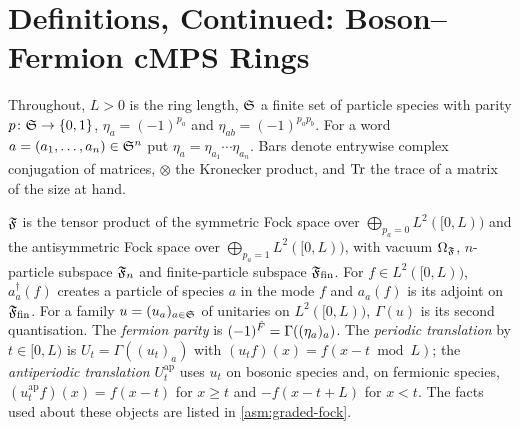 
\section{Definitions, Continued: Boson--Fermion cMPS Rings}
\label{sec:definitions-graded-cmps}

Throughout, $L>0$ is the ring length, $\mathfrak S$ a finite set of particle species with parity
$p\colon\mathfrak S\to\{0,1\}$, $\eta_a=(-1)^{p_a}$ and $\eta_{ab}=(-1)^{p_ap_b}$. For a word
$a=(a_1,\dots,a_n)\in\mathfrak S^n$ put $\eta_a=\eta_{a_1}\cdots\eta_{a_n}$. Bars denote entrywise
complex conjugation of matrices, $\otimes$ the Kronecker product, and $\operatorname{Tr}$ the trace of a
matrix of the size at hand.

\begin{definition}
\label{def:graded-fock}
$\mathfrak F$ is the tensor product of the symmetric Fock space over
$\bigoplus_{p_a=0}L^2([0,L))$ and the antisymmetric Fock space over
$\bigoplus_{p_a=1}L^2([0,L))$, with vacuum $\Omega_{\mathfrak F}$, $n$-particle subspace $\mathfrak F_n$ and
finite-particle subspace $\mathfrak F_{\mathrm{fin}}$. For $f\in L^2([0,L))$, $a^\dagger_a(f)$
creates a particle of species $a$ in the mode $f$ and $a_a(f)$ is its adjoint on
$\mathfrak F_{\mathrm{fin}}$. For a family $u=(u_a)_{a\in\mathfrak S}$ of unitaries on $L^2([0,L))$,
$\Gamma(u)$ is its second quantisation. The \emph{fermion parity} is
$(-1)^{\hat F}=\Gamma((\eta_a)_a)$. The \emph{periodic translation} by $t\in[0,L)$ is
$U_t=\Gamma((u_t)_a)$ with $(u_tf)(x)=f(x-t \bmod L)$; the \emph{antiperiodic translation}
$U^{\mathrm{ap}}_t$ uses $u_t$ on bosonic species and, on fermionic species, $(u^{\mathrm{ap}}_t
f)(x)=f(x-t)$ for $x\ge t$ and $-f(x-t+L)$ for $x<t$. The facts used about these objects are
listed in \cref{asm:graded-fock}.
\end{definition}

